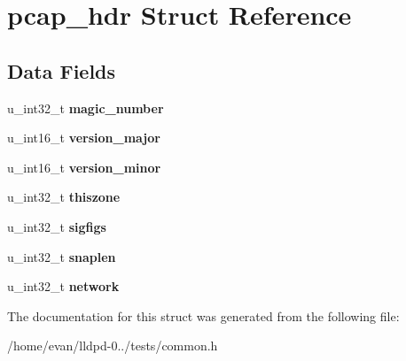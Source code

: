 \section{pcap\-\_\-hdr \-Struct \-Reference}
\label{structpcap__hdr}
\subsection*{\-Data \-Fields}
\begin{DoxyCompactItemize}
\item 
u\-\_\-int32\-\_\-t {\bfseries magic\-\_\-number}\label{structpcap__hdr_af8b7fc48a2f1525dbba985cdebca32ad}

\item 
u\-\_\-int16\-\_\-t {\bfseries version\-\_\-major}\label{structpcap__hdr_a5bafdd58a8175fc2d73386cc327ab420}

\item 
u\-\_\-int16\-\_\-t {\bfseries version\-\_\-minor}\label{structpcap__hdr_ac35bc3f058db09f64d7f432e1e1ec9a4}

\item 
u\-\_\-int32\-\_\-t {\bfseries thiszone}\label{structpcap__hdr_a354599d63b4f9555b83eb7c7f42c5508}

\item 
u\-\_\-int32\-\_\-t {\bfseries sigfigs}\label{structpcap__hdr_a014a416f2ad7c5e16ae6b7a01cd41132}

\item 
u\-\_\-int32\-\_\-t {\bfseries snaplen}\label{structpcap__hdr_a9059383c376e40e113c0888dfefe7623}

\item 
u\-\_\-int32\-\_\-t {\bfseries network}\label{structpcap__hdr_a90e26581b95dd5343221f7ce18c86f0c}

\end{DoxyCompactItemize}


\-The documentation for this struct was generated from the following file\-:\begin{DoxyCompactItemize}
\item 
/home/evan/lldpd-\/0../tests/common.\-h\end{DoxyCompactItemize}
